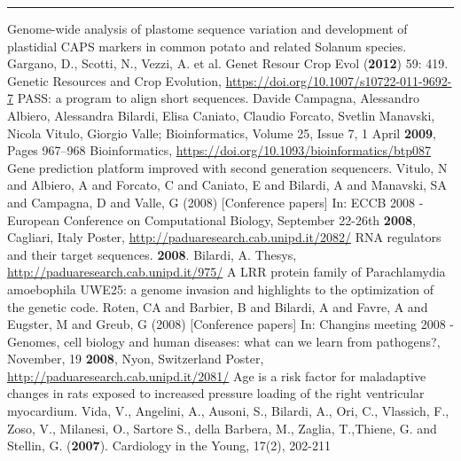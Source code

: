 \documentclass[8pt]{stackoverflow-upgraded-version} %
\begin{document}
\newpage
\textcolor{stackoverflow}{\hrule}
\vspace{\baselineskip} %
\begin{publicationlist}
	\publication
		{Genome-wide analysis of plastome sequence variation and development of plastidial CAPS markers in common potato and related Solanum species.}
		{Gargano, D., Scotti, N., Vezzi, A. et al. Genet Resour Crop Evol (\textbf{2012}) 59: 419.}
		{Genetic Resources and Crop Evolution, \href{https://doi.org/10.1007/s10722-011-9692-7}{https://doi.org/10.1007/s10722-011-9692-7}}
	\publication
		{PASS: a program to align short sequences.}
		{Davide Campagna, Alessandro Albiero, Alessandra Bilardi, Elisa Caniato, Claudio Forcato, Svetlin Manavski, Nicola Vitulo, Giorgio Valle; Bioinformatics, Volume 25, Issue 7, 1 April \textbf{2009}, Pages 967–968}
		{Bioinformatics, \href{https://doi.org/10.1093/bioinformatics/btp087}{https://doi.org/10.1093/bioinformatics/btp087}}
	\publication
		{Gene prediction platform improved with second generation sequencers.}
		{Vitulo, N and Albiero, A and Forcato, C and Caniato, E and Bilardi, A and Manavski, SA and Campagna, D and Valle, G (2008) [Conference papers] In: ECCB 2008 - European Conference on Computational Biology, September 22-26th \textbf{2008}, Cagliari, Italy}
		{Poster, \href{http://paduaresearch.cab.unipd.it/2082/}{http://paduaresearch.cab.unipd.it/2082/}}
	\publication
		{RNA regulators and their target sequences. \textbf{2008}.}
		{Bilardi, A.}
		{Thesys, \href{http://paduaresearch.cab.unipd.it/975/}{http://paduaresearch.cab.unipd.it/975/}}
	\publication
		{A LRR protein family of Parachlamydia amoebophila UWE25: a genome invasion and highlights to the optimization of the genetic code.}
		{Roten, CA and Barbier, B and Bilardi, A and Favre, A and Eugster, M and Greub, G (2008) [Conference papers] In: Changins meeting 2008 - Genomes, cell biology and human diseases: what can we learn from pathogens?, November, 19 \textbf{2008}, Nyon, Switzerland}
		{Poster, \href{http://paduaresearch.cab.unipd.it/2081/}{http://paduaresearch.cab.unipd.it/2081/}}
	\publication
		{Age is a risk factor for maladaptive changes in rats exposed to increased pressure loading of the right ventricular myocardium.}
		{Vida, V., Angelini, A., Ausoni, S., Bilardi, A., Ori, C., Vlassich, F., Zoso, V., Milanesi, O., Sartore S., della Barbera, M., Zaglia, T.,Thiene, G. and Stellin, G. (\textbf{2007}). Cardiology in the Young, 17(2), 202-211}

\end{publicationlist}
\end{document}

